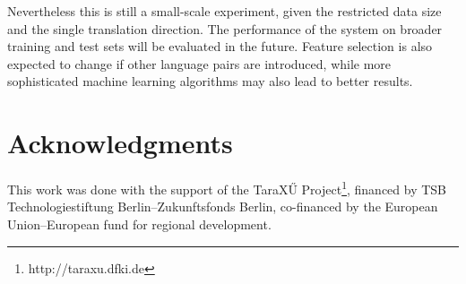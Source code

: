 \documentclass[11pt]{article}
\begin{document}
Nevertheless this is still a small-scale experiment, given the restricted data
size and the single translation direction. The performance of the system on
broader training and test sets will be evaluated in the future. Feature
selection is also expected to change if other language pairs are introduced,
while more sophisticated machine learning algorithms may also lead to better
results. 

\section*{Acknowledgments}
This work was done with the support of the TaraX\H{U}
Project\footnote{http://taraxu.dfki.de}, 
financed by TSB Technologiestiftung Berlin--Zukunftsfonds Berlin, co-financed
by the European Union--European fund for regional development.

 
 

%  
% 
% 
% 
% 
% 
\end{document}

